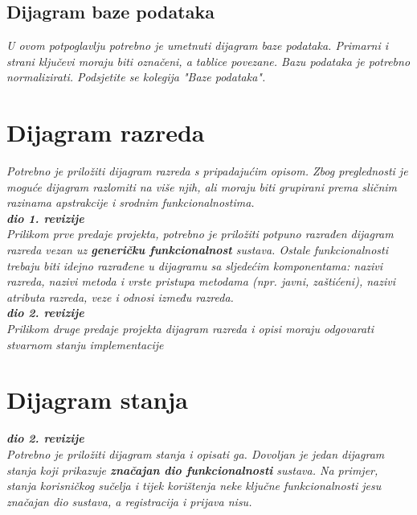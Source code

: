 				
			
			\subsection{Dijagram baze podataka}
				\textit{ U ovom potpoglavlju potrebno je umetnuti dijagram baze podataka. Primarni i strani ključevi moraju biti označeni, a tablice povezane. Bazu podataka je potrebno normalizirati. Podsjetite se kolegija "Baze podataka".}
			
			\eject
			
			
		\section{Dijagram razreda}
		
			\textit{Potrebno je priložiti dijagram razreda s pripadajućim opisom. Zbog preglednosti je moguće dijagram razlomiti na više njih, ali moraju biti grupirani prema sličnim razinama apstrakcije i srodnim funkcionalnostima.}\\
			
			\textbf{\textit{dio 1. revizije}}\\
			
			\textit{Prilikom prve predaje projekta, potrebno je priložiti potpuno razrađen dijagram razreda vezan uz \textbf{generičku funkcionalnost} sustava. Ostale funkcionalnosti trebaju biti idejno razrađene u dijagramu sa sljedećim komponentama: nazivi razreda, nazivi metoda i vrste pristupa metodama (npr. javni, zaštićeni), nazivi atributa razreda, veze i odnosi između razreda.}\\
			
			\textbf{\textit{dio 2. revizije}}\\			
			
			\textit{Prilikom druge predaje projekta dijagram razreda i opisi moraju odgovarati stvarnom stanju implementacije}
			
			
			
			\eject
		
		\section{Dijagram stanja}
			
			
			\textbf{\textit{dio 2. revizije}}\\
			
			\textit{Potrebno je priložiti dijagram stanja i opisati ga. Dovoljan je jedan dijagram stanja koji prikazuje \textbf{značajan dio funkcionalnosti} sustava. Na primjer, stanja korisničkog sučelja i tijek korištenja neke ključne funkcionalnosti jesu značajan dio sustava, a registracija i prijava nisu. }
			
